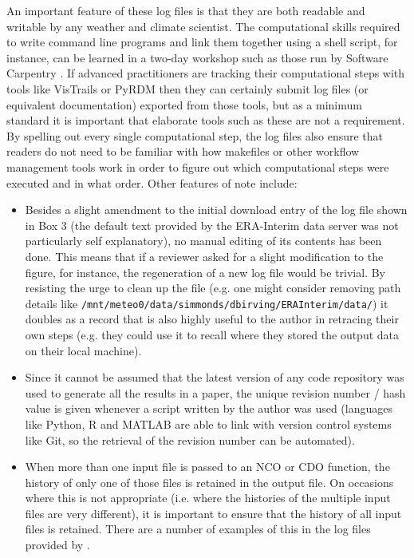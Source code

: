 An important feature of these log files is that they are both readable and writable by any weather and climate scientist. The computational skills required to write command line programs and link them together using a shell script, for instance, can be learned in a two-day workshop such as those run by Software Carpentry \citep{Wilson2014}. If advanced practitioners are tracking their computational steps with tools like VisTrails or PyRDM then they can certainly submit log files (or equivalent documentation) exported from those tools, but as a minimum standard it is important that elaborate tools such as these are not a requirement. By spelling out every single computational step, the log files also ensure that readers do not need to be familiar with how makefiles or other workflow management tools work in order to figure out which computational steps were executed and in what order. Other features of note include:
\begin{itemize}
\item Besides a slight amendment to the initial download entry of the log file shown in Box 3 (the default text provided by the ERA-Interim data server was not particularly self explanatory), no manual editing of its contents has been done. This means that if a reviewer asked for a slight modification to the figure, for instance, the regeneration of a new log file would be trivial. By resisting the urge to clean up the file (e.g. one might consider removing path details like \verb|/mnt/meteo0/data/simmonds/dbirving/ERAInterim/data/|) it doubles as a record that is also highly useful to the author in retracing their own steps (e.g. they could use it to recall where they stored the output data on their local machine).
\item Since it cannot be assumed that the latest version of any code repository was used to generate all the results in a paper, the unique revision number / hash value is given whenever a script written by the author was used (languages like Python, R and MATLAB are able to link with version control systems like Git, so the retrieval of the revision number can be automated).
\item When more than one input file is passed to an NCO or CDO function, the history of only one of those files is retained in the output file. On occasions where this is not appropriate (i.e. where the histories of the multiple input files are very different), it is important to ensure that the history of all input files is retained. There are a number of examples of this in the log files provided by \citet{Irving2015}. 
\end{itemize}
  
 
  
  
  
  
  
  
  
